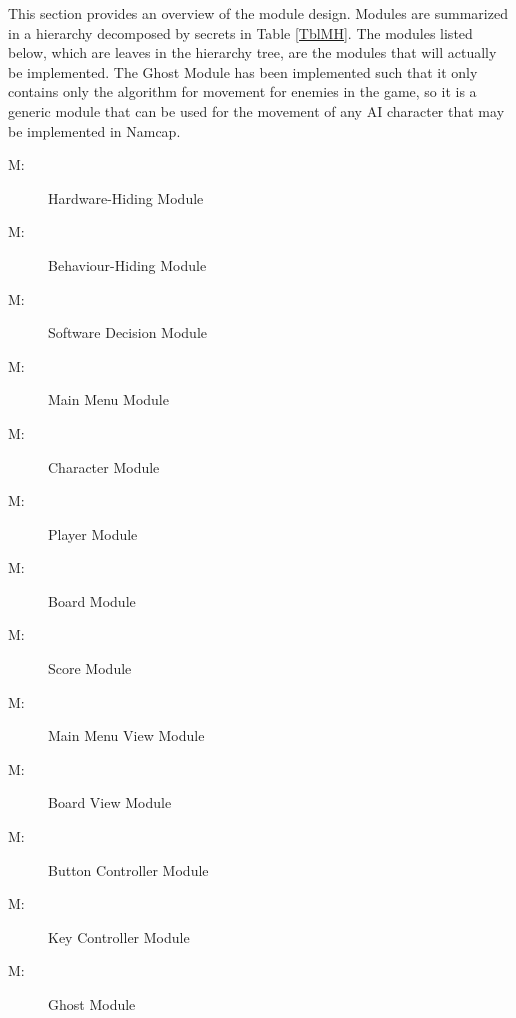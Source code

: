 \documentclass[12pt, titlepage]{article}
\newcounter{mnum}
\newcommand{\mthemnum}{M\themnum}
\begin{document}
This section provides an overview of the module design. Modules are summarized
in a hierarchy decomposed by secrets in Table \ref{TblMH}. The modules listed
below, which are leaves in the hierarchy tree, are the modules that will
actually be implemented. The Ghost Module has been implemented such that it only
contains only the algorithm for movement for enemies in the game, so it is a generic
module that can be used for the movement of any AI character that may be
implemented in Namcap.

\begin{description}
\item [ \mthemnum \label{mHH}:] Hardware-Hiding Module
\item [ \mthemnum \label{mBH}:] Behaviour-Hiding Module
\item [ \mthemnum \label{mSD}:] Software Decision Module
\item [ \mthemnum \label{mMM}:] Main Menu Module
\item [ \mthemnum \label{mC}:] Character Module
\item [ \mthemnum \label{mP}:] Player Module
\item [ \mthemnum \label{mB}:] Board Module
\item [ \mthemnum \label{mS}:] Score Module
\item [ \mthemnum \label{mMV}:] Main Menu View Module
\item [ \mthemnum \label{mBV}:] Board View Module
\item [ \mthemnum \label{mBC}:] Button Controller Module
\item [ \mthemnum \label{mKC}:] Key Controller Module
\item [ \mthemnum \label{mG}:] Ghost Module
\end{description}
\end{document}

